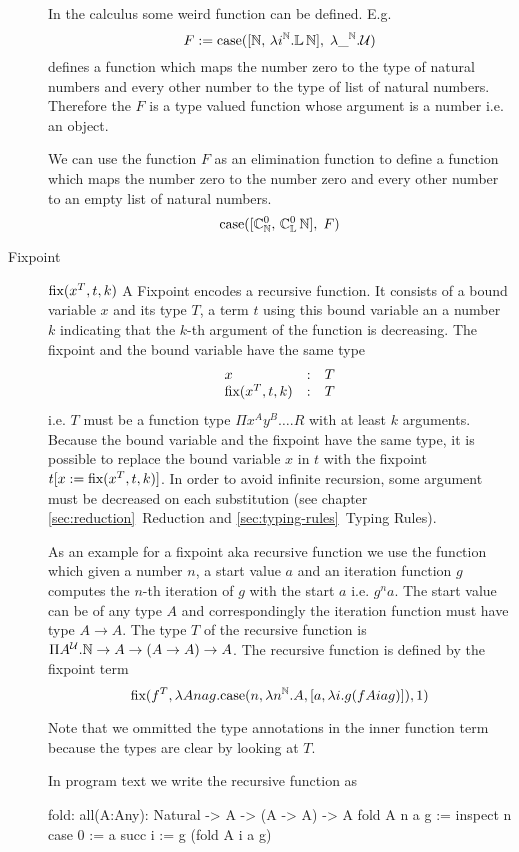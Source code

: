 \begin{description}
    {\def\Nat{\mathbb{N}} \def\List{\mathbb{L}}

        In the calculus some weird function can be defined. E.g.
        $$
        F :=
        \case(
            [\Nat,\, \lambda i^\Nat. \List\, \Nat],\;
            \lambda \_^\Nat. \Any
        )
        $$
        defines a function which maps the number zero to the type of natural numbers
        and every other number to the type of list of natural numbers. Therefore the
        $F$ is a type valued function whose argument is a number i.e. an
        object.

        We can use the function $F$ as an elimination function to define a
        function which maps the number zero to the number zero and every other
        number to an empty list of natural numbers.
        $$
        \case([\Constructor^0_\Nat,\, \Constructor^0_\List\, \Nat],\; F)
        $$
    }


\item[Fixpoint] $\text{fix}(x^T, t, k)$ A Fixpoint encodes a recursive function. It
  consists of a bound variable $x$ and its type $T$, a term $t$ using this
  bound variable an a number $k$ indicating that the $k$-th argument of the
  function is decreasing. The fixpoint and the bound variable have the same
  type
  $$
  \begin{array}{lll}
    x &:& T
    \\
    \text{fix}(x^T, t, k) &:& T
  \end{array}
  $$
  i.e. $T$ must be a function type $\Pi x^A y^B \ldots . R$ with at least $k$
  arguments. Because the bound variable and the fixpoint have the same type,
  it is possible to replace the bound variable $x$ in $t$ with the fixpoint
  $t[x := \text{fix}(x^T, t, k)]$. In order to avoid infinite recursion, some
  argument must be decreased on each substitution (see chapter
  \ref{sec:reduction}~Reduction and \ref{sec:typing-rules}~Typing Rules).

  { \def\Nat{\mathbb{N}}

    As an example for a fixpoint aka recursive function we use the function
    which given a number $n$, a start value $a$ and an iteration function $g$
    computes the $n$-th iteration of $g$ with the start $a$ i.e. $g^n a$. The
    start value can be of any type $A$ and correspondingly the iteration
    function must have type $A \to A$. The type $T$ of the recursive function
    is $\Pi A^\Any. \Nat \to A \to (A \to A) \to A$. The recursive function is
    defined by the fixpoint term
    $$
    \fix (
    f^T,
    \lambda A n a g.
      \case(n,
            \lambda n^\Nat. A,
            [a, \lambda i. g (f A i a g)]
      ),
      1)
    $$
  }%
  Note that we ommitted the type annotations in the inner function term
  because the types are clear by looking at $T$.

  In program text we write the recursive function as
  \begin{alba}
    fold: all(A:Any): Natural -> A -> (A -> A) -> A
    fold A n a g :=
       inspect n case
          0 := a
          succ i := g (fold A i a g)
  \end{alba}
\end{description}






